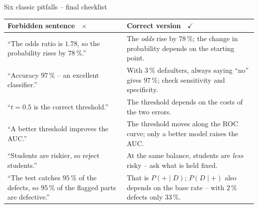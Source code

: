 \documentclass[aspectratio=169,11pt]{beamer}
\begin{document}
\begin{frame}{Six classic pitfalls -- final checklist}
  \small
  \begin{center}
    \renewcommand{\arraystretch}{1.22}
    \begin{tabular}{@{}>{\raggedright\arraybackslash}p{}>{\raggedright\arraybackslash}p{}@{}}
      \toprule
      \textbf{Forbidden sentence \ \textcolor{hsbirot}{$\times$}} &
      \textbf{Correct version \ \textcolor{hsbigruen}{$\checkmark$}}\\
      \midrule
      ``The odds ratio is $1.78$, so the probability rises by $78\,\%$.'' &
        The \emph{odds} rise by $78\,\%$; the change in probability depends on
        the starting point.\\
      ``Accuracy $97\,\%$ -- an excellent classifier.'' &
        With $3\,\%$ defaulters, always saying ``no'' gives $97\,\%$; check
        sensitivity and specificity.\\
      ``$t=0.5$ is the correct threshold.'' &
        The threshold depends on the costs of the two errors.\\
      ``A better threshold improves the AUC.'' &
        The threshold moves along the ROC curve; only a better model raises
        the AUC.\\
      ``Students are riskier, so reject students.'' &
        At the same balance, students are \emph{less} risky -- ask what is
        held fixed.\\
      ``The test catches $95\,\%$ of the defects, so $95\,\%$ of the
      flagged parts are defective.'' &
        That is $P(+\mid D)$; $P(D\mid +)$ also depends on the base rate --
        with $2\,\%$ defects only $33\,\%$.\\
      \bottomrule
    \end{tabular}
  \end{center}
\end{frame}
\end{document}
